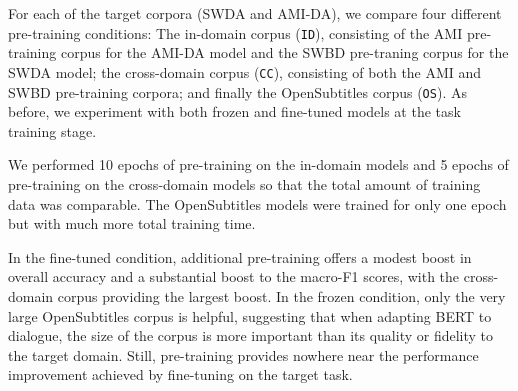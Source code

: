 \documentclass[11pt,a4paper]{article}
\begin{document}
For each of the target corpora (SWDA and AMI-DA), we compare four different pre-training conditions: 
The in-domain corpus (\texttt{ID}), consisting of the AMI pre-training corpus for the AMI-DA model and the SWBD pre-traning corpus for the SWDA model; 
the cross-domain corpus (\texttt{CC}), consisting of both the AMI and SWBD pre-training corpora; 
and finally the OpenSubtitles corpus (\texttt{OS}).
As before, we experiment with both frozen and fine-tuned models at the task training stage.

We performed 10 epochs of pre-training on the in-domain models and 5 epochs of pre-training on the cross-domain models so that the total amount of training data was comparable. The OpenSubtitles models were trained for only one epoch but with much more total training time. 

In the fine-tuned condition, additional pre-training offers a modest boost in overall accuracy and a substantial boost to the macro-F1 scores, with the cross-domain corpus providing the largest boost.
In the frozen condition, only the very large OpenSubtitles corpus is helpful, suggesting that when adapting BERT to dialogue, the size of the corpus is more important than its quality or fidelity to the target domain.
Still, pre-training provides nowhere near the performance improvement achieved by fine-tuning on the target task.
\end{document}
